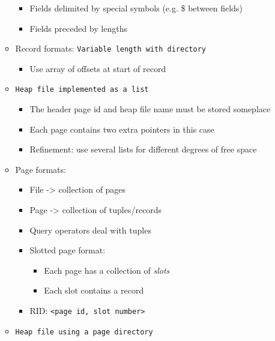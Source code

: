 \documentclass[landscape,8pt]{extarticle}
\newcommand{\code}{\lstinline}
\begin{document}
\begin{multicols}{4}
\begin{itemize}
\begin{itemize}
\begin{itemize}
                            \item Fields delimited by special symbols (e.g. \$ between fields)
                            \item Fields preceded by lengths
                        \end{itemize}
                  \item  Record formats: \code{Variable length with directory}
                        \begin{itemize}
                            \item Use array of offsets at start of record
                        \end{itemize}
                  \item \code{Heap file implemented as a list}
                        \begin{itemize}
                            \item The header page id and heap file name must be stored someplace
                            \item Each page contains two extra pointers in this case
                            \item Refinement: use several lists for different degrees of free space
                        \end{itemize}
                  \item Page formats:
                        \begin{itemize}
                            \item File -> collection of pages
                            \item Page -> collection of tuples/records
                            \item Query operators deal with tuples
                            \item Slotted page format:
                                  \begin{itemize}
                                      \item Each page has a collection of \emph{slots}
                                      \item Each slot contains a record
                                  \end{itemize}
                            \item RID: \code{<page id, slot number>}
                        \end{itemize}
                  \item \code{Heap file using a page directory}

\end{itemize}
\end{itemize}
\end{multicols}
\end{document}
